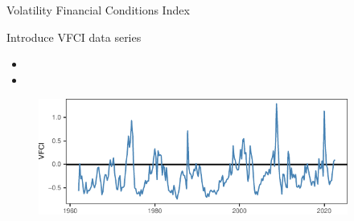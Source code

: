 \begin{frame}{Volatility Financial Conditions Index}
    
    \label{vfci}


    Introduce VFCI data series

    \begin{itemize}
        \item 
    
        \item
    
    \end{itemize}

    \vspace{0.5cm}
    
    \begin{figure}
        \includegraphics[height = 1.5in]{figs/fig2_vfci.pdf}
    \end{figure}
    
\end{frame}
